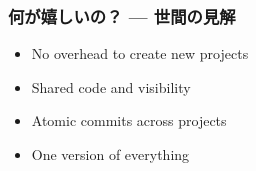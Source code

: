 
\begin{frame}
    \frametitle{何が嬉しいの？ --- 世間の見解}
    
    \begin{itemize}
        \item No overhead to create new projects
        \item Shared code and visibility
        \item Atomic commits across projects
        \item One version of everything
    \end{itemize}
\end{frame}
